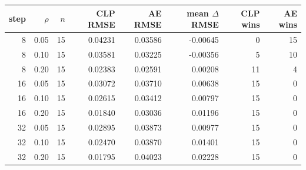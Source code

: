 \begin{tabular}{rrrrrrrr}
\toprule
step & $\rho$ & $n$ & CLP RMSE & AE RMSE & mean $\Delta$RMSE & CLP wins & AE wins \\
\midrule
8 & 0.05 & 15 & 0.04231 & 0.03586 & -0.00645 & 0 & 15 \\
8 & 0.10 & 15 & 0.03581 & 0.03225 & -0.00356 & 5 & 10 \\
8 & 0.20 & 15 & 0.02383 & 0.02591 & 0.00208 & 11 & 4 \\
16 & 0.05 & 15 & 0.03072 & 0.03710 & 0.00638 & 15 & 0 \\
16 & 0.10 & 15 & 0.02615 & 0.03412 & 0.00797 & 15 & 0 \\
16 & 0.20 & 15 & 0.01840 & 0.03036 & 0.01196 & 15 & 0 \\
32 & 0.05 & 15 & 0.02895 & 0.03873 & 0.00977 & 15 & 0 \\
32 & 0.10 & 15 & 0.02470 & 0.03870 & 0.01401 & 15 & 0 \\
32 & 0.20 & 15 & 0.01795 & 0.04023 & 0.02228 & 15 & 0 \\
\bottomrule
\end{tabular}

